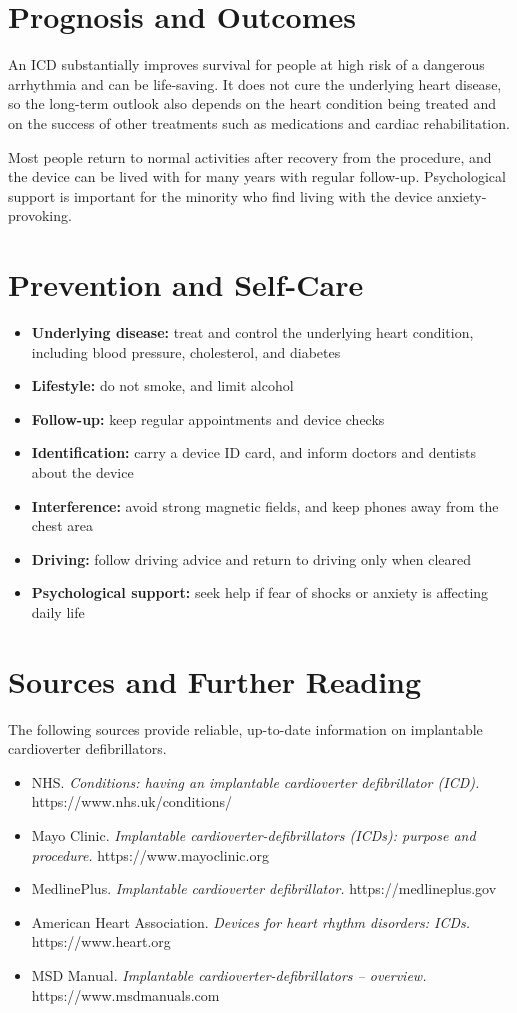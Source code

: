 \section*{Prognosis and Outcomes}
An ICD substantially improves survival for people at high risk of a dangerous arrhythmia and can be life-saving. It does not cure the underlying heart disease, so the long-term outlook also depends on the heart condition being treated and on the success of other treatments such as medications and cardiac rehabilitation.

Most people return to normal activities after recovery from the procedure, and the device can be lived with for many years with regular follow-up. Psychological support is important for the minority who find living with the device anxiety-provoking.

\section*{Prevention and Self-Care}
\begin{itemize}
    \item \textbf{Underlying disease:} treat and control the underlying heart condition, including blood pressure, cholesterol, and diabetes
    \item \textbf{Lifestyle:} do not smoke, and limit alcohol
    \item \textbf{Follow-up:} keep regular appointments and device checks
    \item \textbf{Identification:} carry a device ID card, and inform doctors and dentists about the device
    \item \textbf{Interference:} avoid strong magnetic fields, and keep phones away from the chest area
    \item \textbf{Driving:} follow driving advice and return to driving only when cleared
    \item \textbf{Psychological support:} seek help if fear of shocks or anxiety is affecting daily life
\end{itemize}

\section*{Sources and Further Reading}
The following sources provide reliable, up-to-date information on implantable cardioverter defibrillators.

\begin{itemize}
    \item NHS. \textit{Conditions: having an implantable cardioverter defibrillator (ICD).} https://www.nhs.uk/conditions/
    \item Mayo Clinic. \textit{Implantable cardioverter-defibrillators (ICDs): purpose and procedure.} https://www.mayoclinic.org
    \item MedlinePlus. \textit{Implantable cardioverter defibrillator.} https://medlineplus.gov
    \item American Heart Association. \textit{Devices for heart rhythm disorders: ICDs.} https://www.heart.org
    \item MSD Manual. \textit{Implantable cardioverter-defibrillators -- overview.} https://www.msdmanuals.com
\end{itemize}
